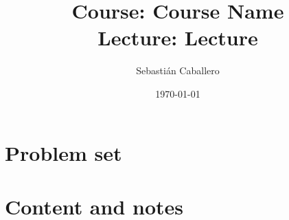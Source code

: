 \documentclass{tufte-handout}
\title{Course:  Course Name \\ Lecture: Lecture}
\author{Sebastián Caballero}
\date{\today}
\begin{document}
\maketitle


\part{Problem set}


\part{Content and notes}
\end{document}
